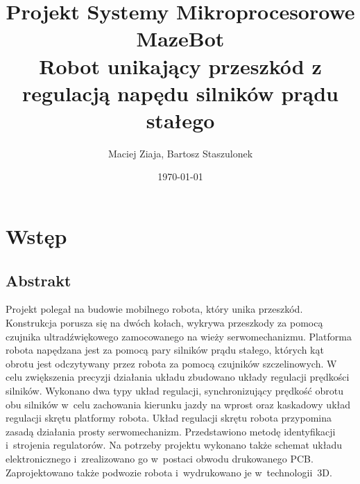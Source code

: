 \documentclass[11pt]{article}
\author{Maciej Ziaja, Bartosz Staszulonek}
\date{\today}
\begin{document}
\title{
  Projekt Systemy Mikroprocesorowe \\
  \large MazeBot \\
    Robot unikający przeszkód z regulacją napędu silników prądu stałego}

\maketitle
\tableofcontents
\newpage

\section{Wstęp}

\subsection{Abstrakt}
Projekt polegał na budowie mobilnego robota, który unika przeszkód.
Konstrukcja porusza się na dwóch kołach, wykrywa przeszkody za pomocą czujnika ultradźwiękowego zamocowanego na wieży serwomechanizmu.
Platforma robota napędzana jest za pomocą pary silników prądu stałego, których kąt obrotu jest odczytywany przez robota za pomocą czujników szczelinowych.
W celu zwiększenia precyzji działania układu zbudowano układy regulacji prędkości silników.
Wykonano dwa typy układ regulacji, synchronizujący prędkość obrotu obu silników w~celu zachowania kierunku jazdy na wprost oraz kaskadowy układ regulacji skrętu platformy robota.
Układ regulacji skrętu robota przypomina zasadą działania prosty serwomechanizm.
Przedstawiono metodę identyfikacji i~strojenia regulatorów.
Na potrzeby projektu wykonano także schemat układu elektronicznego i~zrealizowano go w~postaci obwodu drukowanego PCB.
Zaprojektowano także podwozie robota i~wydrukowano je w~technologii~3D.
\end{document}

